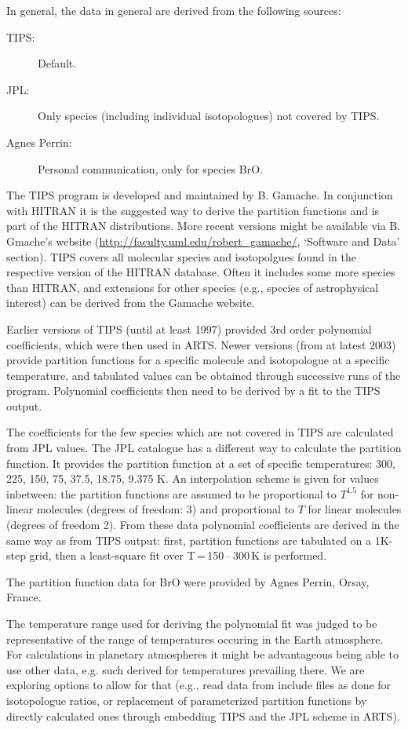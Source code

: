 In general, the data in general are derived from the following sources:
\begin{description}
\item[TIPS:] Default.
\item[JPL:] Only species (including individual isotopologues) not covered by TIPS.
\item[Agnes Perrin:] Personal communication, only for species BrO.
\end{description}

The TIPS program is developed and maintained by B. Gamache. In conjunction
with HITRAN it is the suggested way to derive the partition functions and is
part of the HITRAN distributions. More recent versions might be available via B.
Gmache's website (\url{http://faculty.uml.edu/robert_gamache/}, `Software and
Data' section). TIPS covers all molecular species and isotopolgues found in the
respective version of the HITRAN database. Often it includes some more species
than HITRAN, and extensions for other species (e.g., species of astrophysical
interest) can be derived from the Gamache website.

Earlier versions of TIPS (until at least 1997) provided 3rd order polynomial
coefficients, which were then used in ARTS.
Newer versions (from at latest 2003) provide partition
functions for a specific molecule and isotopologue at a specific temperature,
and tabulated values can be obtained through successive runs of the program.
Polynomial coefficients then need to be derived by a fit to the TIPS output.

The coefficients for the few species which are not covered in
TIPS are calculated from JPL values. The JPL catalogue has a
different way to calculate the partition function. It provides the
partition function at a set of specific temperatures: 300, 225, 150, 75, 37.5,
18.75, 9.375 K. An interpolation scheme is given for values
inbetween: the partition functions are assumed to be proportional to $T^{1.5}$
for non-linear molecules (degrees of freedom: 3) and proportional to $T$ for
linear molecules (degrees of freedom 2).
From these data polynomial coefficients are derived in the same way as from TIPS
output: first, partition functions are tabulated on a 1K-step grid, then a
least-square fit over T\,=\,150\,--\,300\,K is performed.

The partition function data for BrO were provided by Agnes
Perrin, Orsay, France.

The temperature range used for deriving the polynomial fit was judged to be
representative of the range of temperatures occuring in the Earth atmosphere.
For calculations in planetary atmospheres it might be advantageous being able to
use other data, e.g. such derived for temperatures prevailing there. We are
exploring options to allow for that (e.g., read data from include files as
done for isotopologue ratios, or replacement of parameterized partition
functions by directly calculated ones through embedding TIPS and the JPL scheme
in ARTS).

